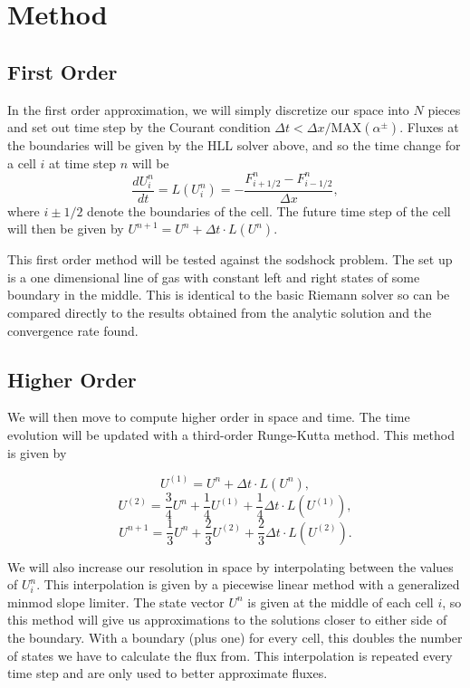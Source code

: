 \documentclass{article}
\begin{document}
\section*{Method}

\subsection*{First Order}

In the first order approximation, we will simply discretize our space into $N$ pieces and set out time step by the Courant condition $\Delta t < \Delta x/\mbox{MAX}(\alpha^\pm)$. Fluxes at the boundaries will be given by the HLL solver above, and so the time change for a cell $i$ at time step $n$ will be 
\begin{equation}
    \frac{dU^n_i}{dt} = L(U^n_i) = -\frac{F^n_{i+1/2} - F^n_{i-1/2}}{\Delta x}, 
\end{equation}
where $i\pm1/2$ denote the boundaries of the cell. The future time step of the cell will then be given by $U^{n+1}= U^n + \Delta t \cdot L(U^n) $. 

This first order method will be tested against the sodshock problem. The set up is a one dimensional line of gas with constant left and right states of some boundary in the middle. This is identical to the basic Riemann solver so can be compared directly to the results obtained from the analytic solution and the convergence rate found. 

\subsection*{Higher Order}

We will then move to compute higher order in space and time. The time evolution will be updated with a third-order Runge-Kutta method. This method is given by

\begin{equation}
    U^{(1)}= U^n + \Delta t \cdot L(U^n),
\end{equation}
\begin{equation}
    U^{(2)}= \frac{3}{4}U^n + \frac{1}{4}U^{(1)}+ \frac{1}{4}\Delta t \cdot L(U^{(1)}),
\end{equation}
\begin{equation}
    U^{n+1}= \frac{1}{3} U^n + \frac{2}{3}U^{(2)} + \frac{2}{3} \Delta t \cdot L(U^{(2)}).
\end{equation}

We will also increase our resolution in space by interpolating between the values of $U^n_i$. This interpolation is given by a piecewise linear method with a generalized minmod slope limiter. The state vector $U^n$ is given at the middle of each cell $i$, so this method will give us approximations to the solutions closer to either side of the boundary. With a boundary (plus one) for every cell, this doubles the number of states we have to calculate the flux from. This interpolation is repeated every time step and are only used to better approximate fluxes. 
\end{document}
